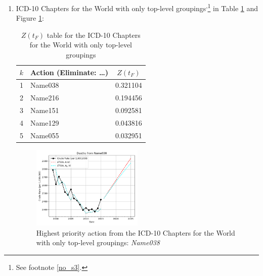 \documentclass[10pt, a4paper, twocolumn]{IEEEconf}
\begin{document}
\begin{enumerate}
  \item ICD-10 Chapters for the World with only top-level groupings\cite{whomortality}\textsuperscript{,}\footnote{See footnote \ref{no_s3}.} in Table \ref{table:ztable10} and Figure \ref{fig:k10}:
    \begin{table}[H]
      \centering
      \begin{tabular}{clc}
        \toprule
          $k$ & Action (Eliminate: \ldots) & $Z(t_F)$ \\
        \midrule
          1   & Name038 & 0.321104 \\
          2   & Name216 & 0.194456 \\
          3   & Name151 & 0.092581 \\
          4   & Name129 & 0.043816 \\
          5   & Name055 & 0.032951 \\
        \bottomrule
      \end{tabular}
      \caption{$Z(t_F)$ table for the ICD-10 Chapters for the World with only top-level groupings}
      \label{table:ztable10}
    \end{table}
    \begin{figure}[H]
      \centering
      \includegraphics[width=0.5\textwidth]{results/WORLD_ICD10_CHAPTER_ROOTS/Name038_ets.png}
      \caption{Highest priority action from the ICD-10 Chapters for the World with only top-level groupings: \textit{Name038}}\label{fig:k10}
    \end{figure}
  

\end{enumerate}
\end{document}
